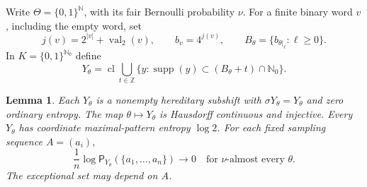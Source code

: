 \documentclass[11pt,reqno]{amsart}
\numberwithin{equation}{section}
\newtheorem{lemma}[theorem]{Lemma}
\theoremstyle{definition}
\theoremstyle{definition}
\newcommand{\N}{\mathbb N}
\newcommand{\Nzero}{\mathbb N_0}
\newcommand{\Patt}{\mathsf P}
\newcommand{\supp}{\operatorname{supp}}
\begin{document}
Write $\Theta=\{0,1\}^{\N}$, with its fair Bernoulli probability
$\nu$. For a finite binary word $v$, including the empty word, set
\[
 j(v)=2^{|v|}+\operatorname{val}_2(v),\qquad
 b_v=4^{j(v)},\qquad
 B_\theta=\{b_{\theta|_\ell}:\ell\ge0\}.
\]
In $K=\{0,1\}^{\Nzero}$ define
\[
 Y_\theta=
 \operatorname{cl}\bigcup_{t\in\mathbb Z}
 \{y:\supp(y)\subset(B_\theta+t)\cap\Nzero\}.
\]

\begin{lemma}\label{lem:sparse-bundle}
Each $Y_\theta$ is a nonempty hereditary subshift with
$\sigma Y_\theta=Y_\theta$ and zero ordinary entropy.
The map $\theta\mapsto Y_\theta$ is Hausdorff continuous and injective.
Every $Y_\theta$ has coordinate maximal-pattern entropy $\log2$.
For each fixed sampling sequence $A=(a_i)$,
\[
 \frac1n\log\Patt_{Y_\theta}(\{a_1,\ldots,a_n\})
 \longrightarrow0
 \quad\text{for }\nu\text{-almost every }\theta.
\]
The exceptional set may depend on $A$.
\end{lemma}
\end{document}
